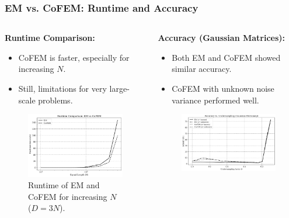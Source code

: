 \documentclass{beamer}
\begin{document}
\begin{frame}
    \frametitle{EM vs. CoFEM: Runtime and Accuracy}
    \begin{columns}
        \begin{column}{0.48\textwidth}
            \textbf{Runtime Comparison:}
            \begin{itemize}
                \item CoFEM is faster, especially for increasing $N$.
                \item Still, limitations for very large-scale problems.
            \end{itemize}
            \begin{figure}[h!]
                \centering
                \includegraphics[width=\textwidth]{Figures/runtime_comp.png}
                \caption{Runtime of EM and CoFEM for increasing $N$ ($D=3N$).}
            \end{figure}
        \end{column}
        \begin{column}{0.48\textwidth}
            \textbf{Accuracy (Gaussian Matrices):}
            \begin{itemize}
                \item Both EM and CoFEM showed similar accuracy.
                \item CoFEM with unknown noise variance performed well.
            \end{itemize}
            \begin{figure}[h!]
                \centering
                \includegraphics[width=\textwidth]{Figures/accuracy_vs_undersampling_EMCoFEM.png}

\end{figure}
\end{column}
\end{columns}
\end{frame}
\end{document}

